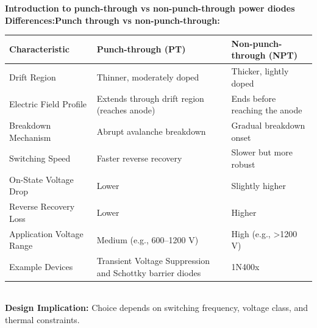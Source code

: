 \begin{frame}{\textbf{Introduction to punch-through vs non-punch-through power diodes}}
    \textbf{Differences:Punch through vs non-punch-through:} 
    \centering
    \small
    \begin{tabular}{|p{3.5cm}|p{4cm}|p{4cm}|}
    \hline
    \textbf{Characteristic} & \textbf{Punch-through (PT)} & \textbf{Non-punch-through (NPT)} \\
    \hline
    Drift Region & Thinner, moderately doped & Thicker, lightly doped \\
    \hline
    Electric Field Profile & Extends through drift region (reaches anode) & Ends before reaching the anode \\
    \hline
    Breakdown Mechanism & Abrupt avalanche breakdown & Gradual breakdown onset \\
    \hline
    Switching Speed & Faster reverse recovery & Slower but more robust \\
    \hline
    On-State Voltage Drop & Lower & Slightly higher \\
    \hline
    Reverse Recovery Loss & Lower & Higher \\
    \hline
    Application Voltage Range & Medium (e.g., 600–1200 V) & High (e.g., >1200 V) \\
    \hline
    Example Devices & Transient Voltage Suppression and Schottky barrier diodes & 1N400x  \\
    \hline
    \end{tabular} \\
    \vspace{0.3cm}
    \textbf{Design Implication:} Choice depends on switching frequency, voltage class, and thermal constraints.
\end{frame}

